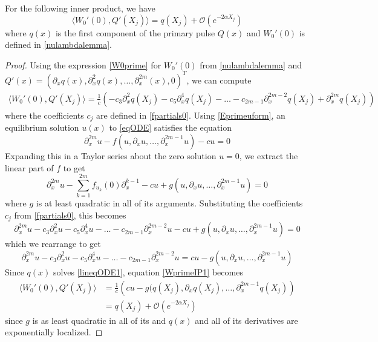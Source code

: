 \documentclass[thesis.tex]{subfiles}
\begin{document}
\begin{lemma}\label{lemma:WprimeIP}
For the following inner product, we have
\begin{equation}\label{WprimeIP}
\langle W_0'(0), Q'(X_j) \rangle = q(X_j) + \mathcal{O}(e^{-2\alpha X_j})
\end{equation}
where $q(x)$ is the first component of the primary pulse $Q(x)$ and $W_0'(0)$ is defined in \cref{nulambdalemma}.
\begin{proof}
Using the expression \cref{W0prime} for $W_0'(0)$ from \cref{nulambdalemma} and $Q'(x) = (\partial_x q(x), \partial_x^2 q(x), \dots, \partial_x^{2m}(x), 0)^T$, we can compute
\begin{align}\label{WprimeIP1}
\langle W_0'(0), Q'(X_j) \rangle = 
\frac{1}{c} \left( -c_3 \partial_x^2 q(X_j) -c_5 \partial_x^4 q(X_j) -\dots -c_{2m-1} \partial_x^{2m-2} q(X_j) + \partial_x^{2m} q(X_j) \right)
\end{align}
where the coefficients $c_j$ are defined in \cref{fpartials0}. Using \cref{Eprimeuform}, an equilibrium solution $u(x)$ to \cref{eqODE} satisfies the equation
\[
\partial_x^{2m} u- f(u, \partial_x u, \dots, \partial_x^{2m-1}u ) - cu = 0
\]
Expanding this in a Taylor series about the zero solution $u = 0$, we extract the linear part of $f$  to get
\[
\partial_x^{2m} u - \sum_{k=1}^{2m} f_{u_k}(0) \partial_x^{k-1} - cu + g(u, \partial_x u, \dots, \partial_x^{2m-1}u ) = 0
\]
where $g$ is at least quadratic in all of its arguments. Substituting the coefficients $c_j$ from \cref{fpartials0}, this becomes
\begin{equation*}
\partial_x^{2m} u - c_3 \partial_x^2 u - c_5 \partial_x^4 u - \dots - c_{2m-1} \partial_x^{2m-2}u - cu + g(u, \partial_x u, \dots, \partial_x^{2m-1}u ) = 0
\end{equation*}
which we rearrange to get 
\begin{equation}\label{lineqODE1}
\partial_x^{2m} u - c_3 \partial_x^2 u - c_5 \partial_x^4 u - \dots - c_{2m-1} \partial_x^{2m-2}u = cu - g(u, \partial_x u, \dots, \partial_x^{2m-1}u )
\end{equation}
Since $q(x)$ solves \cref{lineqODE1}, equation \cref{WprimeIP1} becomes
\begin{align*}
\langle W_0'(0), Q'(X_j) \rangle &= 
\frac{1}{c} \left( cu - g(q(X_j), \partial_x q(X_j), \dots, \partial_x^{2m-1}q(X_j) \right) \\
&= q(X_j) + \mathcal{O}(e^{-2\alpha X_j})
\end{align*}
since $g$ is as least quadratic in all of its and $q(x)$ and all of its derivatives are exponentially localized.
\end{proof}
\end{lemma}
\end{document}
